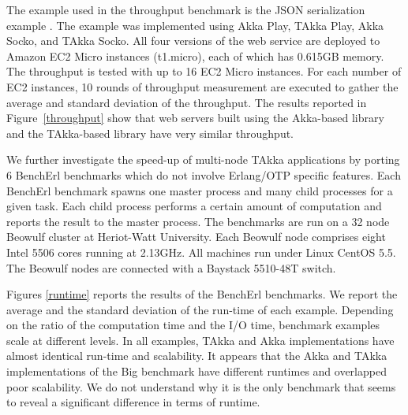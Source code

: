 The example used in the throughput benchmark is the JSON serialization example 
\cite{techempower}.  The example was implemented using Akka Play, TAkka Play, Akka 
Socko, and TAkka Socko.  All four versions of the web service are deployed to 
Amazon EC2 Micro instances (t1.micro), each of which has 0.615GB memory. The throughput 
is tested with up to 16 EC2 Micro instances.  For each number of EC2 instances, 
10 rounds of throughput measurement are executed to gather the average and 
standard deviation of the throughput. The results reported in Figure~\ref{throughput} show that
web servers built using the Akka-based library and the TAkka-based library have very similar throughput.



We further investigate the speed-up of multi-node TAkka applications by 
porting 6  BenchErl benchmarks \cite{RELEASE} which do not involve Erlang/OTP 
specific features.  Each BenchErl benchmark spawns one master process and 
many child processes for a given task.  Each child process performs 
a certain amount of computation and reports the result to the master process.  
The benchmarks are run on a 32 node Beowulf cluster at Heriot-Watt 
University. Each Beowulf node comprises eight Intel 5506 cores running at
2.13GHz. All machines run under Linux CentOS 5.5. The Beowulf nodes are
connected with a Baystack 5510-48T switch.

Figures \ref{runtime} reports the results of the BenchErl 
benchmarks.   We report the average and the standard deviation 
of the run-time of each example.  Depending on the ratio of the computation 
time and the I/O time, benchmark examples scale at different levels.  In 
all examples, TAkka and Akka implementations have almost identical 
run-time and scalability.  It appears that the Akka and TAkka implementations
of the Big benchmark have different runtimes and overlapped poor scalability.
We do not understand why it is the only benchmark that seems to reveal a 
significant difference in terms of runtime.

